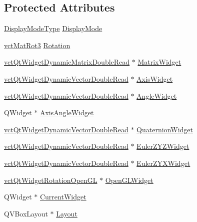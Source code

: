 \subsection*{Protected Attributes}
\begin{DoxyCompactItemize}
\item 
\hyperlink{classvct_qt_widget_rotation_double_read_a77ae5a0ee5fe231ad2f9dd020aad434c}{Display\+Mode\+Type} \hyperlink{classvct_qt_widget_rotation_double_read_a94210cdbcdb5bc33b8f5650c11602fba}{Display\+Mode}
\item 
\hyperlink{vct_transformation_types_8h_a30fe23c1d38748a9b8f2fb9bb2471382}{vct\+Mat\+Rot3} \hyperlink{classvct_qt_widget_rotation_double_read_ab356235edf17d23d15ce8289b4ad91c9}{Rotation}
\item 
\hyperlink{classvct_qt_widget_dynamic_matrix_double_read}{vct\+Qt\+Widget\+Dynamic\+Matrix\+Double\+Read} $\ast$ \hyperlink{classvct_qt_widget_rotation_double_read_adc00f353c77e8bdacea999862525a98c}{Matrix\+Widget}
\item 
\hyperlink{vct_qt_forward_declarations_8h_a6cbce1b6d338096215fc40cb0fdfb848}{vct\+Qt\+Widget\+Dynamic\+Vector\+Double\+Read} $\ast$ \hyperlink{classvct_qt_widget_rotation_double_read_a9ee41a77e34de07df6f5ff07d84a5475}{Axis\+Widget}
\item 
\hyperlink{vct_qt_forward_declarations_8h_a6cbce1b6d338096215fc40cb0fdfb848}{vct\+Qt\+Widget\+Dynamic\+Vector\+Double\+Read} $\ast$ \hyperlink{classvct_qt_widget_rotation_double_read_abb6e58717cd7c8fb1f7009d13c0620f6}{Angle\+Widget}
\item 
Q\+Widget $\ast$ \hyperlink{classvct_qt_widget_rotation_double_read_a3844f6a9444da39ef3128c92ee0df21d}{Axis\+Angle\+Widget}
\item 
\hyperlink{vct_qt_forward_declarations_8h_a6cbce1b6d338096215fc40cb0fdfb848}{vct\+Qt\+Widget\+Dynamic\+Vector\+Double\+Read} $\ast$ \hyperlink{classvct_qt_widget_rotation_double_read_ac469ac805f4ad832983f39cb6768da6b}{Quaternion\+Widget}
\item 
\hyperlink{vct_qt_forward_declarations_8h_a6cbce1b6d338096215fc40cb0fdfb848}{vct\+Qt\+Widget\+Dynamic\+Vector\+Double\+Read} $\ast$ \hyperlink{classvct_qt_widget_rotation_double_read_afa391035ce844d15576568341fe76ff2}{Euler\+Z\+Y\+Z\+Widget}
\item 
\hyperlink{vct_qt_forward_declarations_8h_a6cbce1b6d338096215fc40cb0fdfb848}{vct\+Qt\+Widget\+Dynamic\+Vector\+Double\+Read} $\ast$ \hyperlink{classvct_qt_widget_rotation_double_read_a7c7bd62052f17e43c02e33c716ba25cf}{Euler\+Z\+Y\+X\+Widget}
\item 
\hyperlink{classvct_qt_widget_rotation_open_g_l}{vct\+Qt\+Widget\+Rotation\+Open\+G\+L} $\ast$ \hyperlink{classvct_qt_widget_rotation_double_read_a98528053032a5996bb4f13f0d6b09fd6}{Open\+G\+L\+Widget}
\item 
Q\+Widget $\ast$ \hyperlink{classvct_qt_widget_rotation_double_read_aaf10f5198b34b0bcdbb7a9ba6838862c}{Current\+Widget}
\item 
Q\+V\+Box\+Layout $\ast$ \hyperlink{classvct_qt_widget_rotation_double_read_adfea7d24e7293efe2734d0adfccb32e5}{Layout}
\end{DoxyCompactItemize}


